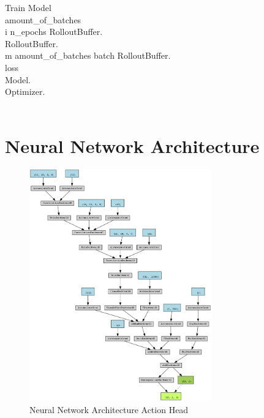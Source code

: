 \renewcommand{\thepseudonum}{\roman{pseudonum}}
\begin{pseudocode}{Train Model}{ }
    \\

    amount\_of\_batches \GETS {}\\
    \FOR i  \TO n\_epochs \DO
    \BEGIN
    RolloutBuffer.\\
    RolloutBuffer.\\
    \FOR m  \TO amount\_of\_batches \DO
    \BEGIN
    batch \GETS RolloutBuffer.\\
    loss \GETS {}\\
    Model.\\
    Optimizer.\\
    \END\\
    \END
    \ENDPROCEDURE
    \label{pseudocode:train_model}
\end{pseudocode}

\section{Neural Network Architecture}

\begin{figure}
    \centering
    \includegraphics[width=0.7\textwidth]{Bilder/action_graph.png}
    \caption{Neural Network Architecture Action Head}
    \label{fig:action_graph}
\end{figure}

